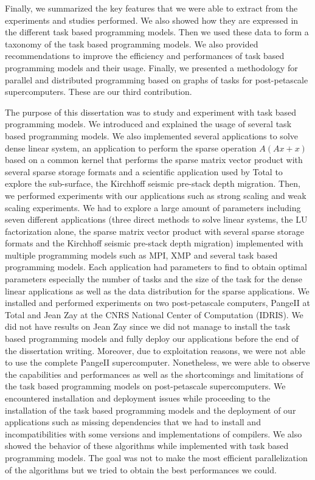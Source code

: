 Finally, we summarized the key features that we were able to extract from the experiments and studies performed.
We also showed how they are expressed in the different task based programming models.
Then we used these data to form a taxonomy of the task based programming models.
We also provided recommendations to improve the efficiency and performances of task based programming models and their usage.
Finally, we presented a methodology for parallel and distributed programming based on graphs of tasks for post-petascale supercomputers.
These are our third contribution.

The purpose of this dissertation was to study and experiment with task based programming models.
We introduced and explained the usage of several task based programming models.
We also implemented several applications to solve dense linear system, an application to perform the sparse operation $A(Ax+x)$ based on a common kernel that performs the sparse matrix vector product with several sparse storage formats and a scientific application used by Total to explore the sub-surface, the Kirchhoff seismic pre-stack depth migration.
Then, we performed experiments with our applications such as strong scaling and weak scaling experiments.
We had to explore a large amount of parameters including seven different applications (three direct methods to solve linear systems, the LU factorization alone, the sparse matrix vector product with several sparse storage formats and the Kirchhoff seismic pre-stack depth migration) implemented with multiple programming models such as MPI, XMP and several task based programming models.
Each application had parameters to find to obtain optimal parameters especially the number of tasks and the size of the task for the dense linear applications as well as the data distribution for the sparse applications.
We installed and performed experiments on two post-petascale computers, PangeII at Total and Jean Zay at the CNRS National Center of Computation (IDRIS).
We did not have results on Jean Zay since we did not manage to install the task based programming models and fully deploy our applications before the end of the dissertation writing.
Moreover, due to exploitation reasons, we were not able to use the complete PangeII supercomputer.
Nonetheless, we were able to observe the capabilities and performances as well as the shortcomings and limitations of the task based programming models on post-petascale supercomputers.
We encountered installation and deployment issues while proceeding to the installation of the task based programming models and the deployment of our applications such as missing dependencies that we had to install and incompatibilities with some versions and implementations of compilers.
We also showed the behavior of these algorithms while implemented with task based programming models.
The goal was not to make the most efficient parallelization of the algorithms but we tried to obtain the best performances we could.

